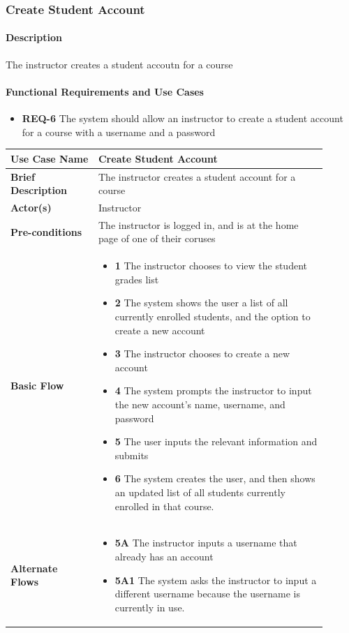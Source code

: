 \documentclass{article}
\begin{document}
\subsubsection{Create Student Account}

\paragraph{Description} The instructor creates a student accoutn for a course

\paragraph{Functional Requirements and Use Cases}

\begin{itemize}
  \item \textbf{REQ-6} The system should allow an instructor to create a student account for a course with a username and a password
\end{itemize}

\vspace{0.2in}

\begin{tabular}{| p{0.25\linewidth} | p{0.65\linewidth} |}
  \hline
  \textbf{Use Case Name} & Create Student Account \\
  \hline
  \textbf{Brief Description} & The instructor creates a student account for a course \\
  \hline
  \textbf{Actor(s)} & Instructor \\
  \hline
  \textbf{Pre-conditions} & The instructor is logged in, and is at the home page of one of their coruses\\
  \hline
  \textbf{Basic Flow} & \begin{itemize}
    \item[] \textbf{1} The instructor chooses to view the student grades list
    \item[] \textbf{2} The system shows the user a list of all currently enrolled students, and the option to create a new account
    \item[] \textbf{3} The instructor chooses to create a new account
    \item[] \textbf{4} The system prompts the instructor to input the new account's name, username, and password
    \item[] \textbf{5} The user inputs the relevant information and submits
    \item[] \textbf{6} The system creates the user, and then shows an updated list of all students currently enrolled in that course.
  \end{itemize}\\
  \hline
  \textbf{Alternate Flows} & \begin{itemize}
    \item[] \textbf{5A} The instructor inputs a username that already has an account
    \item[] \textbf{5A1} The system asks the instructor to input a different username because the username is currently in use.
  \end{itemize} \\
  \hline
\end{tabular}
\end{document}
